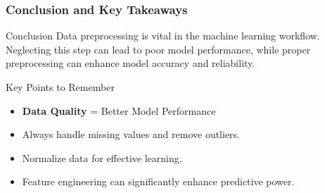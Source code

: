 \documentclass[aspectratio=169]{beamer}
\begin{document}
\begin{frame}[fragile]
    \frametitle{Conclusion and Key Takeaways}
    \begin{block}{Conclusion}
        Data preprocessing is vital in the machine learning workflow. Neglecting this step can lead to poor model performance, while proper preprocessing can enhance model accuracy and reliability.
    \end{block}
    
    \begin{block}{Key Points to Remember}
        \begin{itemize}
            \item \textbf{Data Quality} = Better Model Performance
            \item Always handle missing values and remove outliers.
            \item Normalize data for effective learning.
            \item Feature engineering can significantly enhance predictive power.
        \end{itemize}
    \end{block}
\end{frame}
\end{document}
